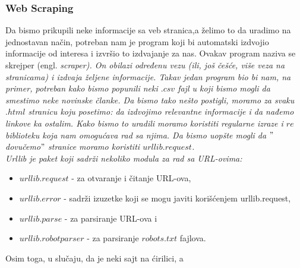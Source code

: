\documentclass[a4paper]{article}
\begin{document}
\subsubsection{Web Scraping} 
Da bismo prikupili neke informacije sa veb stranica,a želimo to da uradimo na jednostavan način, potreban nam je program koji bi automatski izdvojio informacije od interesa i izvršio to izdvajanje za nas. Ovakav program naziva se skrejper (engl. \em{scraper}). On obilazi određenu vezu (ili, još češće, više veza na stranicama) i izdvaja željene informacije. Takav jedan program bio bi nam, na primer, potreban kako bismo popunili neki $.csv$ fajl u koji bismo mogli da smestimo neke novinske članke. Da bismo tako nešto postigli, moramo za svaku $.html$ stranicu koju posetimo: da izdvojimo relevantne informacije i da nađemo linkove ka ostalim. Kako bismo to uradili moramo koristiti regularne izraze i $re$ biblioteku koja nam omogućava rad sa njima. Da bismo uopšte mogli da $"$dovučemo$"$ stranice moramo koristiti $urllib.request$. \\
Urllib je paket koji sadrži nekoliko modula za rad sa URL-ovima:
\begin{itemize}
\item $urllib.request$ - za otvaranje i čitanje URL-ova,
\item $urllib.error$ - sadrži izuzetke koji se mogu javiti korišćenjem urllib.request,
\item $urllib.parse$ - za parsiranje URL-ova i 
\item $urllib.robotparser$ - za parsiranje $robots.txt$ fajlova.
\end{itemize}
Osim toga, u slučaju, da je neki sajt na ćirilici, a 
\end{document}
